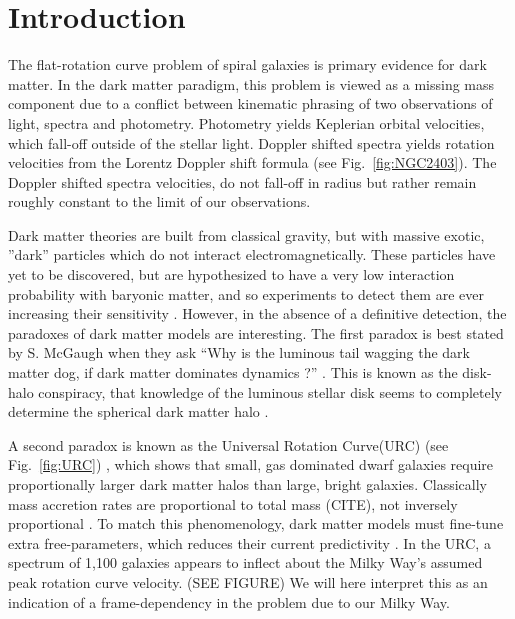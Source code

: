 \documentclass[reprint,%
 amsmath,amssymb,
 aps,
]{revtex4-1}
\begin{document}
\section{Introduction  \label{sec:uno}}



 The flat-rotation curve problem of spiral galaxies  is primary evidence for dark matter\cite{Rub,Bosma,1985ApJAlbada}. 
 In the dark matter paradigm, this problem is   viewed as a missing mass component due to a conflict between kinematic phrasing of  two      observations of light, spectra and photometry. Photometry yields Keplerian orbital velocities, which fall-off outside of the stellar light. Doppler shifted spectra yields rotation velocities from the Lorentz Doppler shift formula  (see Fig.~\ref{fig:NGC2403}). The Doppler shifted spectra velocities, do not fall-off in radius but rather remain roughly constant to the limit of our observations. 
 
 
 
Dark matter theories are built from classical gravity, but with massive
exotic,     ''dark'' particles  which do not interact electromagnetically.   These particles have   yet to be    discovered, but are hypothesized to have a very low interaction probability with baryonic matter, and so  experiments to detect them are ever increasing their sensitivity \cite{Cebrian:2022brv}. However, in the absence of a definitive detection, the paradoxes of dark matter models are interesting. The first paradox is best stated by 
  S. McGaugh  when they ask   ``Why is the luminous tail wagging the dark matter dog,  if dark matter dominates dynamics ?'' \cite{1999McGaugh,McGaugh2016RAR}. This is known as the  disk-halo conspiracy,
that knowledge of 
 the luminous stellar   disk seems to completely determine the spherical dark matter halo \cite{2004ApJ...609..652M}. 
 
 
 
 
 A second paradox  is known as  the Universal Rotation Curve(URC)   (see Fig.~\ref{fig:URC}) \cite{salucci,Persic,1978Rubin,10.1111/j.1365-2966.2007.11696.x}, which  shows that small, gas dominated dwarf galaxies require   proportionally larger dark matter halos than   large,  bright  galaxies.  Classically mass accretion rates are proportional to total mass (CITE), not inversely proportional  \cite{10.1093/mnras/stt2403}.  To match this phenomenology, dark matter models must  fine-tune extra free-parameters,  which  reduces their current  predictivity   \cite{MCGAUGH2021220}. In the URC, 
 a spectrum of 1,100 galaxies    appears to inflect  about  the Milky Way's assumed   peak  rotation curve velocity. (SEE FIGURE)
 We will here interpret this as an indication of a frame-dependency in the problem due to our Milky Way. 
 
\end{document}
